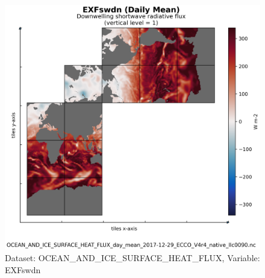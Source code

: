 \begin{figure}[H]
\centering
\includegraphics[scale=0.55]{../images/plots/native_plots/Ocean_and_Sea-Ice_Surface_Heat_Fluxes/EXFswdn.png}
\caption{Dataset: OCEAN\_AND\_ICE\_SURFACE\_HEAT\_FLUX, Variable: EXFswdn}
\label{tab:table-OCEAN_AND_ICE_SURFACE_HEAT_FLUX_EXFswdn-Plot}
\end{figure}
\newpage
\pagebreak
